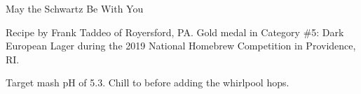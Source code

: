 \stylesection{\styleschwarzbier}

\begin{recipe}{May the Schwartz Be With You}

\begin{aboutblock}
Recipe by Frank Taddeo of Royersford, PA. Gold medal in Category \#5: Dark European
Lager during the 2019 National Homebrew Competition in Providence, RI. \sourceaha
\end{aboutblock}


\begin{methodandtiming}
 
\begin{mashsteps}
\end{mashsteps}

\begin{fermentationsteps}
\end{fermentationsteps}

\begin{directions}
Target mash pH of 5.3. Chill to  before adding the whirlpool hops.
\end{directions}

\end{methodandtiming}

\recipebreak

\begin{ingredientsblock}

\begin{malts}
\end{malts}

\begin{hops}
\end{hops}


\end{ingredientsblock}

\end{recipe}

